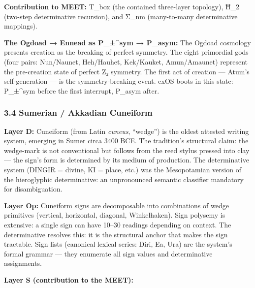 \textbf{Contribution to MEET:} T\_box (the contained three-layer
topology), Ħ\_2 (two-step determinative recursion), and Σ\_nm
(many-to-many determinative mappings).

\textbf{The Ogdoad → Ennead as P\_±\^{}sym → P\_asym:} The Ogdoad
cosmology presents creation as the breaking of perfect symmetry. The
eight primordial gods (four pairs: Nun/Naunet, Heh/Hauhet, Kek/Kauket,
Amun/Amaunet) represent the pre-creation state of perfect Z₂ symmetry.
The first act of creation --- Atum's self-generation --- is the
symmetry-breaking event. exOS boots in this state: P\_±\^{}sym before
the first interrupt, P\_asym after.

\subsubsection{3.4 Sumerian / Akkadian
Cuneiform}\label{sumerian-akkadian-cuneiform}

\textbf{Layer D:} Cuneiform (from Latin \emph{cuneus}, ``wedge'') is the
oldest attested writing system, emerging in Sumer circa 3400 BCE. The
tradition's structural claim: the wedge-mark is not conventional but
follows from the reed stylus pressed into clay --- the sign's form is
determined by its medium of production. The determinative system (DINGIR
= divine, KI = place, etc.) was the Mesopotamian version of the
hieroglyphic determinative: an unpronounced semantic classifier
mandatory for disambiguation.

\textbf{Layer Op:} Cuneiform signs are decomposable into combinations of
wedge primitives (vertical, horizontal, diagonal, Winkelhaken). Sign
polysemy is extensive: a single sign can have 10--30 readings depending
on context. The determinative resolves this: it is the structural anchor
that makes the sign tractable. Sign lists (canonical lexical series:
Diri, Ea, Ura) are the system's formal grammar --- they enumerate all
sign values and determinative assignments.

\textbf{Layer S (contribution to the MEET):}


